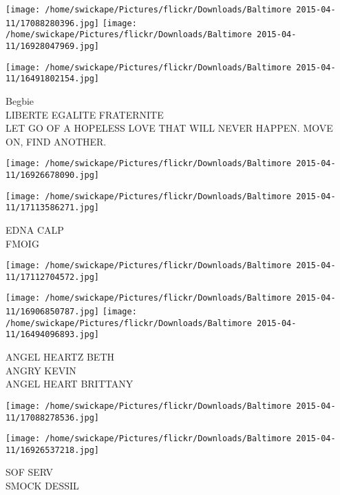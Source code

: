 \documentclass[10pt,letterpaper]{article}
\begin{document}
\texttt{[image: /home/swickape/Pictures/flickr/Downloads/Baltimore 2015-04-11/17088280396.jpg]}
\texttt{[image: /home/swickape/Pictures/flickr/Downloads/Baltimore 2015-04-11/16928047969.jpg]}

\texttt{[image: /home/swickape/Pictures/flickr/Downloads/Baltimore 2015-04-11/16491802154.jpg]}

Begbie\\
LIBERTE EGALITE FRATERNITE\\
LET GO OF A HOPELESS LOVE THAT WILL NEVER HAPPEN.  MOVE ON, FIND ANOTHER.
\pagebreak

\texttt{[image: /home/swickape/Pictures/flickr/Downloads/Baltimore 2015-04-11/16926678090.jpg]}

\vspace{0.25in}
\texttt{[image: /home/swickape/Pictures/flickr/Downloads/Baltimore 2015-04-11/17113586271.jpg]}

EDNA CALP\\
FMOIG
\pagebreak

\texttt{[image: /home/swickape/Pictures/flickr/Downloads/Baltimore 2015-04-11/17112704572.jpg]}

\vspace{0.25in}
\texttt{[image: /home/swickape/Pictures/flickr/Downloads/Baltimore 2015-04-11/16906850787.jpg]}
\texttt{[image: /home/swickape/Pictures/flickr/Downloads/Baltimore 2015-04-11/16494096893.jpg]}

ANGEL HEARTZ BETH\\
ANGRY KEVIN\\
ANGEL HEART BRITTANY
\pagebreak

\texttt{[image: /home/swickape/Pictures/flickr/Downloads/Baltimore 2015-04-11/17088278536.jpg]}

\vspace{0.25in}
\texttt{[image: /home/swickape/Pictures/flickr/Downloads/Baltimore 2015-04-11/16926537218.jpg]}

SOF SERV\\
SMOCK DESSIL
\pagebreak
\end{document}
